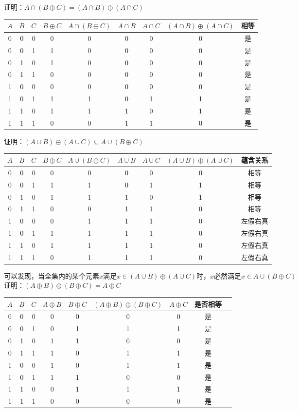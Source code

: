 证明：$A \cap (B \oplus C) = (A \cap B) \oplus (A \cap C)$
\begin{center}
\begin{tabular}{ccc|cccccc}
$A$ & $B$ & $C$ & $B \oplus C$ & $A \cap (B \oplus C)$ & $A \cap B$ & $A \cap C$ & $(A \cap B) \oplus (A \cap C)$ & 相等 \\
\hline
0 & 0 & 0 & 0 & 0 & 0 & 0 & 0 & 是 \\
0 & 0 & 1 & 1 & 0 & 0 & 0 & 0 & 是 \\
0 & 1 & 0 & 1 & 0 & 0 & 0 & 0 & 是 \\
0 & 1 & 1 & 0 & 0 & 0 & 0 & 0 & 是 \\
1 & 0 & 0 & 0 & 0 & 0 & 0 & 0 & 是 \\
1 & 0 & 1 & 1 & 1 & 0 & 1 & 1 & 是 \\
1 & 1 & 0 & 1 & 1 & 1 & 0 & 1 & 是 \\
1 & 1 & 1 & 0 & 0 & 1 & 1 & 0 & 是 \\
\end{tabular}
\end{center}
证明：$(A\cup B)\oplus(A\cup C)\subseteq A\cup(B\oplus C)$
\begin{center}
\begin{tabular}{ccc|cccccc}
$A$ & $B$ & $C$ & $B \oplus C$ & $A \cup (B \oplus C)$ & $A \cup B$ & $A \cup C$ & $(A \cup B) \oplus (A \cup C)$ & 蕴含关系 \\
\hline
0 & 0 & 0 & 0 & 0 & 0 & 0 & 0 & 相等 \\
0 & 0 & 1 & 1 & 1 & 0 & 1 & 1 & 相等 \\
0 & 1 & 0 & 1 & 1 & 1 & 0 & 1 & 相等 \\
0 & 1 & 1 & 0 & 0 & 1 & 1 & 0 & 相等 \\
1 & 0 & 0 & 0 & 1 & 1 & 1 & 0 & 左假右真 \\
1 & 0 & 1 & 1 & 1 & 1 & 1 & 0 & 左假右真 \\
1 & 1 & 0 & 1 & 1 & 1 & 1 & 0 & 左假右真 \\
1 & 1 & 1 & 0 & 1 & 1 & 1 & 0 & 左假右真 \\
\end{tabular}
\end{center}
可以发现，当全集内的某个元素$x$满足$x\in (A \cup B) \oplus (A \cup C)$时，$x$必然满足$x\in A\cup(B\oplus C)$\\
证明：$(A \oplus B) \oplus (B \oplus C) = A \oplus C$
\begin{center}
\begin{tabular}{ccc|cccccc}
$A$ & $B$ & $C$ & $A \oplus B$ & $B \oplus C$ & $(A \oplus B) \oplus (B \oplus C)$ & $A \oplus C$ & 是否相等 \\
\hline
0 & 0 & 0 & 0 & 0 & 0 & 0 & 是 \\
0 & 0 & 1 & 0 & 1 & 1 & 1 & 是 \\
0 & 1 & 0 & 1 & 1 & 0 & 0 & 是 \\
0 & 1 & 1 & 1 & 0 & 1 & 1 & 是 \\
1 & 0 & 0 & 1 & 0 & 1 & 1 & 是 \\
1 & 0 & 1 & 1 & 1 & 0 & 0 & 是 \\
1 & 1 & 0 & 0 & 1 & 1 & 1 & 是 \\
1 & 1 & 1 & 0 & 0 & 0 & 0 & 是 \\
\end{tabular}
\end{center}
